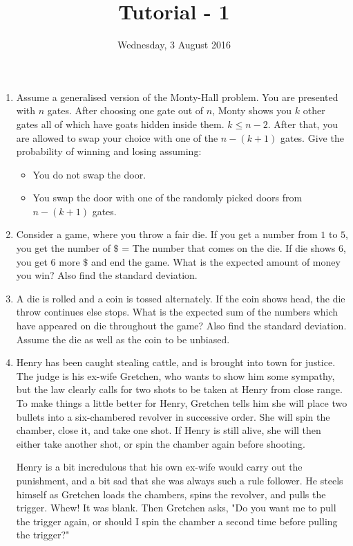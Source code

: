 \documentclass{llncs}
\title{Tutorial - 1}
\author{Wednesday, 3 August 2016}
\institute{To be conducted on: 10 August 2016}
\begin{document}
\maketitle
\vspace{5mm}
\begin{enumerate}

\item Assume a generalised version of the Monty-Hall problem. You are presented with $n$ gates. After choosing one gate out of $n$, Monty shows you $k$ other gates all of which have goats hidden inside them. $k \leq n-2$. After that, you are allowed to swap your choice with one of the $n-(k+1)$ gates. Give the probability of winning and losing assuming: 
\begin{itemize}
\item You do not swap the door. 
\item You swap the door with one of the randomly picked doors from $n-(k+1)$ gates. 
\end{itemize}

\item Consider a game, where you throw a fair die. If you get a number from $1$ to $5$, you get the number of $\$$ = The number that comes on the die. If die shows $6$, you get $6$ more $\$$ and end the game. What is the expected amount of money you win? Also find the standard deviation.

\item A die is rolled and a coin is tossed alternately. If the coin shows head, the die throw continues else stops. What is the expected sum of the numbers which have appeared on die throughout the game? Also find the standard deviation. Assume the die as well as the coin to be unbiased. 

\item Henry has been caught stealing cattle, and is brought into town for justice. The judge is his ex-wife Gretchen, who wants to show him some sympathy, but the law clearly calls for two shots to be taken at Henry from close range. To make things a little better for Henry, Gretchen tells him she will place two bullets into a six-chambered revolver in successive order. She will spin the chamber, close it, and take one shot. If Henry is still alive, she will then either take another shot, or spin the chamber again before shooting.

Henry is a bit incredulous that his own ex-wife would carry out the punishment, and a bit sad that she was always such a rule follower. He steels himself as Gretchen loads the chambers, spins the revolver, and pulls the trigger. Whew! It was blank. Then Gretchen asks, "Do you want me to pull the trigger again, or should I spin the chamber a second time before pulling the trigger?"


\end{enumerate}
\end{document}

